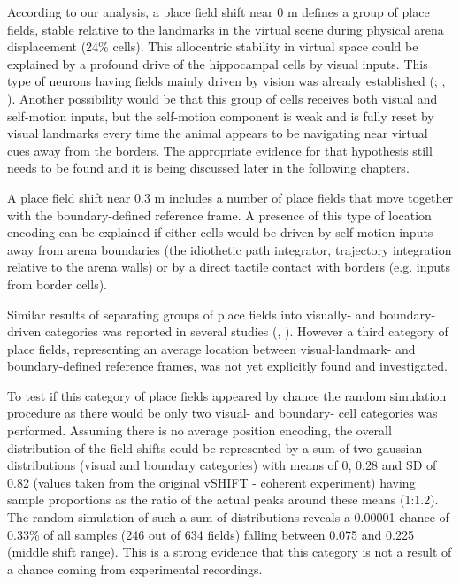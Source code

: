 According to our analysis, a place field shift near 0 m defines a group of place fields, stable relative to the landmarks in the virtual scene during physical arena displacement (24\% cells). This allocentric stability in virtual space could be explained by a profound drive of the hippocampal cells by visual inputs. This type of neurons having fields mainly driven by vision was already established (\cite{Muller1987}; \cite{Chen2013}, \cite{Haas2019}). Another possibility would be that this group of cells receives both visual and self-motion inputs, but the self-motion component is weak and is fully reset by visual landmarks every time the animal appears to be navigating near virtual cues away from the borders. The appropriate evidence for that hypothesis still needs to be found and it is being discussed later in the following chapters.

A place field shift near 0.3 m includes a number of place fields that move together with the boundary-defined reference frame. A presence of this type of location encoding can be explained if either cells would be driven by self-motion inputs away from arena boundaries (the idiothetic path integrator, trajectory integration relative to the arena walls) or by a direct tactile contact with borders (e.g. inputs from border cells).

Similar results of separating groups of place fields into visually- and boundary-driven categories was reported in several studies (\cite{Chen2013}, \cite{Haas2019}). However a third category of place fields, representing an average location between visual-landmark- and boundary-defined reference frames, was not yet explicitly found and investigated.

To test if this category of place fields appeared by chance the random simulation procedure as there would be only two visual- and boundary- cell categories was performed. Assuming there is no average position encoding, the overall distribution of the field shifts could be represented by a sum of two gaussian distributions (visual and boundary categories) with means of 0, 0.28 and SD of 0.82 (values taken from the original vSHIFT - coherent experiment) having sample proportions as the ratio of the actual peaks around these means (1:1.2). The random simulation of such a sum of distributions reveals a 0.00001 chance of 0.33\% of all samples (246 out of 634 fields) falling between 0.075 and 0.225 (middle shift range). This is a strong evidence that this category is not a result of a chance coming from experimental recordings.


